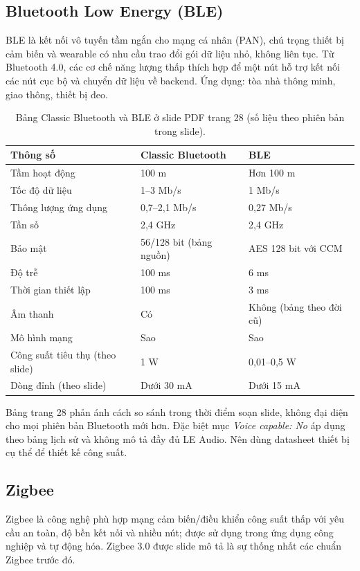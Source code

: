 \subsection{Bluetooth Low Energy (BLE)}
BLE là kết nối vô tuyến tầm ngắn cho mạng cá nhân (PAN), chú trọng thiết bị cảm biến và wearable có nhu cầu trao đổi gói dữ liệu nhỏ, không liên tục. Từ Bluetooth 4.0, các cơ chế năng lượng thấp thích hợp để một nút hỗ trợ kết nối các nút cục bộ và chuyển dữ liệu về backend. Ứng dụng: tòa nhà thông minh, giao thông, thiết bị đeo. 

\begin{table}[htbp]\centering\small
\caption{Bảng Classic Bluetooth và BLE ở slide PDF trang 28 (số liệu theo phiên bản trong slide).}
\begin{tabularx}{\textwidth}{p{3.4cm}XX}\toprule
Thông số & Classic Bluetooth & BLE\\\midrule
Tầm hoạt động & 100 m & Hơn 100 m\\
Tốc độ dữ liệu & 1--3 Mb/s & 1 Mb/s\\
Thông lượng ứng dụng & 0,7--2,1 Mb/s & 0,27 Mb/s\\
Tần số & 2,4 GHz & 2,4 GHz\\
Bảo mật & 56/128 bit (bảng nguồn) & AES 128 bit với CCM\\
Độ trễ & 100 ms & 6 ms\\
Thời gian thiết lập & 100 ms & 3 ms\\
Âm thanh & Có & Không (bảng theo đời cũ)\\
Mô hình mạng & Sao & Sao\\
Công suất tiêu thụ (theo slide) & 1 W & 0,01--0,5 W\\
Dòng đỉnh (theo slide) & Dưới 30 mA & Dưới 15 mA\\\bottomrule
\end{tabularx}\end{table}

\begin{nguonslide}[title={Lưu ý với bảng Bluetooth}]
Bảng trang 28 phản ánh cách so sánh trong thời điểm soạn slide, không đại diện cho mọi phiên bản Bluetooth mới hơn. Đặc biệt mục \emph{Voice capable: No} áp dụng theo bảng lịch sử và không mô tả đầy đủ LE Audio. Nên dùng datasheet thiết bị cụ thể để thiết kế công suất.
\end{nguonslide}

\subsection{Zigbee}
Zigbee là công nghệ phù hợp mạng cảm biến/điều khiển công suất thấp với yêu cầu an toàn, độ bền kết nối và nhiều nút; được sử dụng trong ứng dụng công nghiệp và tự động hóa. Zigbee 3.0 được slide mô tả là sự thống nhất các chuẩn Zigbee trước đó. 


